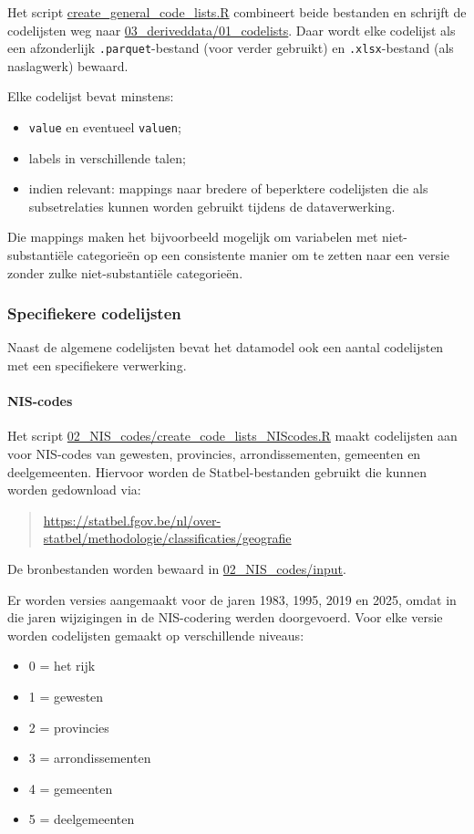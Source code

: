 \documentclass{VSAnote}
\begin{document}
Het script \url{create_general_code_lists.R} combineert beide bestanden en schrijft de codelijsten weg naar \url{03_deriveddata/01_codelists}. Daar wordt elke codelijst als een afzonderlijk \texttt{.parquet}-bestand (voor verder gebruikt) en \texttt{.xlsx}-bestand (als naslagwerk) bewaard.

Elke codelijst bevat minstens:
\begin{itemize}
\item \verb+value+ en eventueel \verb+valuen+;
\item labels in verschillende talen;
\item indien relevant: mappings naar bredere of beperktere codelijsten die als subsetrelaties kunnen worden gebruikt tijdens de dataverwerking.
\end{itemize}

Die mappings maken het bijvoorbeeld mogelijk om variabelen met niet-substantiële categorieën op een consistente manier om te zetten naar een versie zonder zulke niet-substantiële categorieën.

\subsubsection{Specifiekere codelijsten}

Naast de algemene codelijsten bevat het datamodel ook een aantal codelijsten met een specifiekere verwerking.

\paragraph{NIS-codes}

Het script \url{02_NIS_codes/create_code_lists_NIScodes.R} maakt codelijsten aan voor NIS-codes van gewesten, provincies, arrondissementen, gemeenten en deelgemeenten. Hiervoor worden de Statbel-bestanden gebruikt die kunnen worden gedownload via:
\begin{quote}
\url{https://statbel.fgov.be/nl/over-statbel/methodologie/classificaties/geografie}
\end{quote}
De bronbestanden worden bewaard in \url{02_NIS_codes/input}.

Er worden versies aangemaakt voor de jaren 1983, 1995, 2019 en 2025, omdat in die jaren wijzigingen in de NIS-codering werden doorgevoerd. Voor elke versie worden codelijsten gemaakt op verschillende niveaus:
\begin{itemize}[nosep]
\item 0 = het rijk
\item 1 = gewesten
\item 2 = provincies
\item 3 = arrondissementen
\item 4 = gemeenten
\item 5 = deelgemeenten
\end{itemize}
\end{document}
